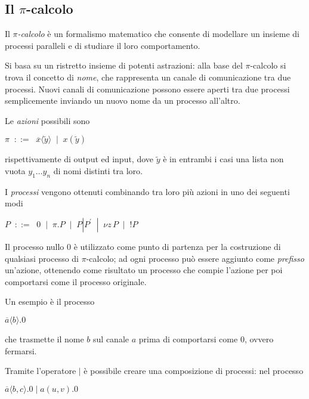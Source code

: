 \subsection{Il \texorpdfstring{$\pi$}{pi}-calcolo}

Il \emph{$\pi$-calcolo} \`e un formalismo matematico che consente di
modellare un insieme di processi paralleli e di studiare il loro
comportamento.

Si basa su un ristretto insieme di potenti astrazioni: alla base del
$\pi$-calcolo si trova il concetto di \emph{nome}, che rappresenta un
canale di comunicazione tra due processi. Nuovi canali di comunicazione
possono essere aperti tra due processi semplicemente inviando un nuovo
nome da un processo all'altro.

Le \emph{azioni} possibili sono

\begin{pilisting}
$
    \pi \;\; ::= \;\; \overline{x}\langle\tilde{y}\rangle
        \;\; |   \;\; x(\tilde{y})
$
\end{pilisting}

rispettivamente di output ed input, dove $\tilde{y}$ \`e in entrambi i casi
una lista non vuota $ y_1 \ldots y_n$ di nomi distinti tra loro.

I \emph{processi} vengono ottenuti combinando tra loro pi\`u azioni in uno
dei seguenti modi

\begin{pilisting}
$
    P \;\; ::= \;\; 0
      \;\; |   \;\; \pi.P
      \;\; |   \;\; P|P^{'}
      \;\; |   \;\; \nu z \, P
      \;\; |   \;\; !P
$
\end{pilisting}

Il processo nullo $0$ \`e utilizzato come punto di partenza per la
costruzione di qualsiasi processo di $\pi$-calcolo; ad ogni processo pu\`o
essere aggiunto come \emph{prefisso} un'azione, ottenendo come risultato un
processo che compie l'azione per poi comportarsi come il processo originale.

Un esempio \`e il processo

\begin{pilisting}
$
    \overline{a}\langle b\rangle.0
$
\end{pilisting}

che trasmette il nome $b$ sul canale $a$ prima di comportarsi come $0$,
ovvero fermarsi.

Tramite l'operatore $|$ \`e possibile creare una composizione di processi:
nel processo

\begin{pilisting}
$
    \overline{a}\langle b,c\rangle.0 \; | \;
    a(u,v).0
$
\end{pilisting}

